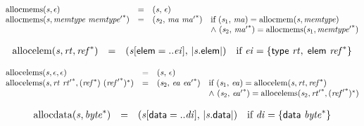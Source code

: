 $$
\begin{array}{@{}lcl@{}l@{}}
{\mathrm{allocmems}}({\mathit{s}}, \epsilon) &=& ({\mathit{s}},\, \epsilon) &  \\
{\mathrm{allocmems}}({\mathit{s}}, {\mathit{memtype}}~{{\mathit{memtype}'}^\ast}) &=& ({\mathit{s}}_{{2}},\, {\mathit{ma}}~{{\mathit{ma}'}^\ast}) &\quad
  \mbox{if}~({\mathit{s}}_{{1}},\, {\mathit{ma}}) = {\mathrm{allocmem}}({\mathit{s}}, {\mathit{memtype}}) \\
 &&&\quad {\land}~({\mathit{s}}_{{2}},\, {{\mathit{ma}'}^\ast}) = {\mathrm{allocmems}}({\mathit{s}}_{{1}}, {{\mathit{memtype}'}^\ast}) \\
\end{array}
$$

$$
\begin{array}{@{}lcl@{}l@{}}
{\mathrm{allocelem}}({\mathit{s}}, {\mathit{rt}}, {{\mathit{ref}}^\ast}) &=& ({\mathit{s}}[\mathsf{elem} = ..{\mathit{ei}}],\, {|{\mathit{s}}.\mathsf{elem}|}) &\quad
  \mbox{if}~{\mathit{ei}} = \{ \begin{array}[t]{@{}l@{}}
\mathsf{type}~{\mathit{rt}},\; \mathsf{elem}~{{\mathit{ref}}^\ast} \}\end{array} \\
\end{array}
$$

$$
\begin{array}{@{}lcl@{}l@{}}
{\mathrm{allocelems}}({\mathit{s}}, \epsilon, \epsilon) &=& ({\mathit{s}},\, \epsilon) &  \\
{\mathrm{allocelems}}({\mathit{s}}, {\mathit{rt}}~{{\mathit{rt}'}^\ast}, ({{\mathit{ref}}^\ast})~{({{\mathit{ref}'}^\ast})^\ast}) &=& ({\mathit{s}}_{{2}},\, {\mathit{ea}}~{{\mathit{ea}'}^\ast}) &\quad
  \mbox{if}~({\mathit{s}}_{{1}},\, {\mathit{ea}}) = {\mathrm{allocelem}}({\mathit{s}}, {\mathit{rt}}, {{\mathit{ref}}^\ast}) \\
 &&&\quad {\land}~({\mathit{s}}_{{2}},\, {{\mathit{ea}'}^\ast}) = {\mathrm{allocelems}}({\mathit{s}}_{{2}}, {{\mathit{rt}'}^\ast}, {({{\mathit{ref}'}^\ast})^\ast}) \\
\end{array}
$$

$$
\begin{array}{@{}lcl@{}l@{}}
{\mathrm{allocdata}}({\mathit{s}}, {{\mathit{byte}}^\ast}) &=& ({\mathit{s}}[\mathsf{data} = ..{\mathit{di}}],\, {|{\mathit{s}}.\mathsf{data}|}) &\quad
  \mbox{if}~{\mathit{di}} = \{ \begin{array}[t]{@{}l@{}}
\mathsf{data}~{{\mathit{byte}}^\ast} \}\end{array} \\
\end{array}
$$


